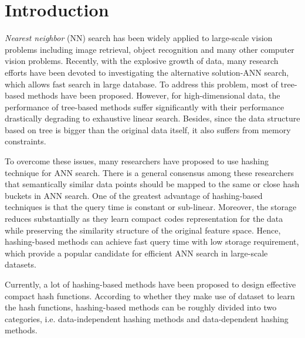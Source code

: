 \documentclass{sig-alternate}
\begin{document}



\section{Introduction}

\emph{Nearest neighbor} (NN) search has been widely applied to large-scale vision problems including image retrieval, object recognition and many other computer vision problems. Recently, with the explosive growth of data, many research efforts have been devoted to investigating the alternative solution-ANN search, which allows fast search in large database. To address this problem, most of tree-based methods have been proposed. However, for high-dimensional data, the performance of tree-based methods suffer significantly with their performance drastically degrading to exhaustive linear search. Besides, since the data structure based on tree is bigger than the original data itself, it also suffers from memory constraints.

To overcome these issues, many researchers have proposed to use hashing technique for ANN search. There is a general consensus among these researchers that semantically similar data points should be mapped to the same or close hash buckets in ANN search. One of the greatest advantage of hashing-based techniques is that the query time is constant or sub-linear. Moreover, the storage reduces substantially as they learn compact codes representation for the data while preserving the similarity structure of the original feature space. Hence, hashing-based methods can achieve fast query time with low storage requirement, which provide a popular candidate for efficient ANN search in large-scale datasets.

Currently, a lot of hashing-based methods have been proposed to design effective compact hash functions. According to whether they make use of dataset to learn the hash functions, hashing-based methods can be roughly divided into two categories, i.e. data-independent hashing methods and data-dependent hashing methods.
\end{document}
